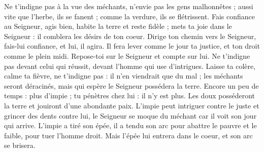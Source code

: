 Ne t'indigne pas à la vue des méchants, n'envie pas les gens malhonnêtes ;
\versseparator
aussi vite que l'herbe, ils se fanent ; comme la verdure, ils se flétrissent.
\versseparator
Fais confiance au Seigneur, agis bien, habite la terre et reste fidèle ;
\versseparator
mets ta joie dans le Seigneur : il comblera les désirs de ton coeur.
\versseparator
Dirige ton chemin vers le Seigneur, fais-lui confiance, et lui, il agira.
\versseparator
Il fera lever comme le jour ta justice, et ton droit comme le plein midi.
\versseparator
Repose-toi sur le Seigneur et compte sur lui. Ne t'indigne pas devant celui qui réussit, devant l'homme qui use d'intrigues.
\versseparator
Laisse ta colère, calme ta fièvre, ne t'indigne pas : il n'en viendrait que du mal ;
\versseparator
les méchants seront déracinés, mais qui espère le Seigneur possédera la terre.
\versseparator
Encore un peu de temps : plus d'impie ; tu pénètres chez lui : il n'y est plus.
\versseparator
Les doux posséderont la terre et jouiront d'une abondante paix.
\versseparator
L'impie peut intriguer contre le juste et grincer des dents contre lui,
\versseparator
le Seigneur se moque du méchant car il voit son jour qui arrive.
\versseparator
L'impie a tiré son épée, il a tendu son arc pour abattre le pauvre et le faible, pour tuer l'homme droit.
\versseparator
Mais l'épée lui entrera dans le coeur, et son arc se brisera.
